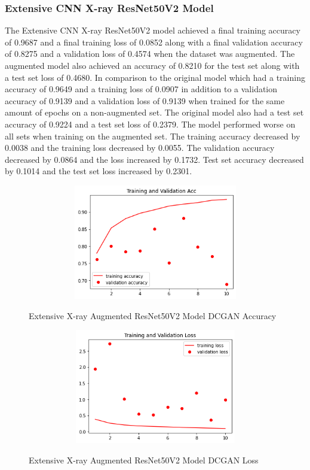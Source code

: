 \subsubsection{Extensive CNN X-ray ResNet50V2 Model}
The Extensive CNN X-ray ResNet50V2 model achieved a final training accuracy of 0.9687 and a final training loss of 0.0852 along with a final validation accuracy of 0.8275 and a validation loss of 0.4574 when the dataset was augmented.  The augmented model also achieved an accuracy of 0.8210 for the test set along with a test set loss of 0.4680.  In comparison to the original model which had a training accuracy of 0.9649 and a training loss of 0.0907 in addition to a validation accuracy of 0.9139 and a validation loss of 0.9139 when trained for the same amount of epochs on a non-augmented set.  The original model also had a test set accuracy of 0.9224 and a test set loss of 0.2379.  The model performed worse on all sets when training on the augmented set.  The training accuracy decreased by 0.0038 and the training loss decreased by 0.0055. The validation accuracy decreased by 0.0864 and the loss increased by 0.1732.  Test set accuracy decreased by 0.1014 and the test set loss increased by 0.2301.
 \begin{figure}[H]
    \centering    \includegraphics[width=1\textwidth,height=5cm,keepaspectratio]{Images/ResNet50V2BaselineTrainingValidationAccuracyExtensiveXray.png}\\
    \caption{Extensive X-ray Augmented ResNet50V2 Model DCGAN Accuracy}
    \label{fig:Extensive X-ray Augmented ResNet50V2 Model DCGAN Accuracy}
\end{figure}
 \begin{figure}[H]
    \centering
    \includegraphics[width=1\textwidth,height=5cm,keepaspectratio]{Images/ResNet50V2BaselineTrainingValidationLossExtensiveXrayAugmentedDCGAN.png}\\
    \caption{Extensive X-ray Augmented ResNet50V2 Model DCGAN Loss}
    \label{fig:Extensive X-ray Augmented ResNet50V2 Model DCGAN Loss}
\end{figure}
